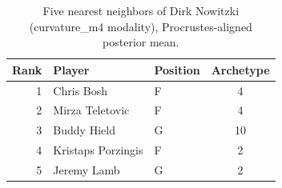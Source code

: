 \begin{table}[htbp]
  \centering\small
  \begin{tabular}{rllc}
    \toprule
    Rank & Player & Position & Archetype \\
    \midrule
    1 & Chris Bosh & F & 4 \\
    2 & Mirza Teletovic & F & 4 \\
    3 & Buddy Hield & G & 10 \\
    4 & Kristaps Porzingis & F & 2 \\
    5 & Jeremy Lamb & G & 2 \\
    \bottomrule
  \end{tabular}
  \caption{Five nearest neighbors of Dirk Nowitzki (curvature_m4 modality), Procrustes-aligned posterior mean.}
  \label{tab:Dirk_Nowitzki_neighbors_curvature_m4}
\end{table}

